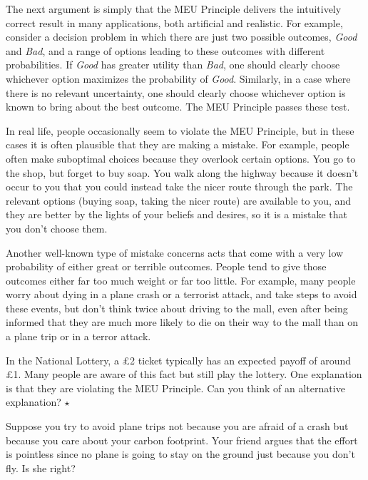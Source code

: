 The next argument is simply that the MEU Principle delivers the
intuitively correct result in many applications, both artificial and
realistic. For example, consider a decision problem in which there are
just two possible outcomes, \emph{Good} and \emph{Bad}, and a range of
options leading to these outcomes with different probabilities. If
\emph{Good} has greater utility than \emph{Bad}, one should clearly
choose whichever option maximizes the probability of
\emph{Good}. Similarly, in a case where there is no relevant
uncertainty, one should clearly choose whichever option is known to
bring about the best outcome. The MEU Principle passes these test.

In real life, people occasionally seem to violate the MEU Principle,
but in these cases it is often plausible that they are making a
mistake. For example, people often make suboptimal choices because
they overlook certain options. You go to the shop, but forget to buy
soap. You walk along the highway because it doesn't occur to you that
you could instead take the nicer route through the park. The relevant
options (buying soap, taking the nicer route) are available to you,
and they are better by the lights of your beliefs and desires, so it
is a mistake that you don't choose them. 

Another well-known type of mistake concerns acts that come with a very
low probability of either great or terrible outcomes. People tend to
give those outcomes either far too much weight or far too little. For
example, many people worry about dying in a plane crash or a terrorist
attack, and take steps to avoid these events, but don't think twice
about driving to the mall, even after being informed that they are
much more likely to die on their way to the mall than on a plane trip
or in a terror attack.

\begin{exercise}
  In the National Lottery, a £2 ticket typically has an expected
  payoff of around £1. Many people are aware of this fact but still
  play the lottery. One explanation is that they are violating the MEU
  Principle. Can you think of an alternative explanation? $\star$
\end{exercise}

Suppose you try to avoid plane trips not because you are afraid of a
crash but because you care about your carbon footprint. Your friend
argues that the effort is pointless since no plane is going to stay on
the ground just because you don't fly. Is she right?

